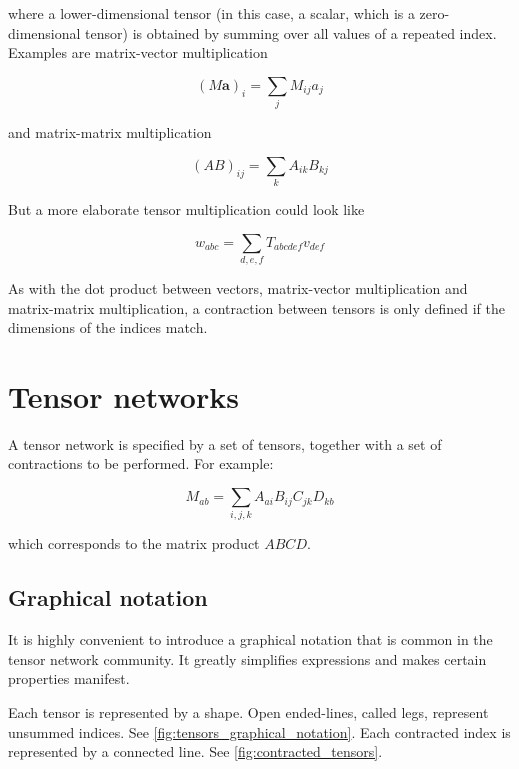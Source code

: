 where a lower-dimensional tensor (in this case, a scalar, which is a
zero-dimensional tensor) is obtained by summing over all values of a repeated
index. Examples are matrix-vector multiplication

\begin{equation}
  (M \bm{a})_{i} = \sum_j M_{i j} a_j
\end{equation}

and matrix-matrix multiplication

\begin{equation}
  (A B)_{i j} = \sum_k A_{i k} B_{k j}
\end{equation}

But a more elaborate tensor multiplication could look like

\begin{equation}
  w_{a b c} = \sum_{d, e, f} T_{a b c d e f} v_{d e f}
\end{equation}

As with the dot product between vectors, matrix-vector multiplication and
matrix-matrix multiplication, a contraction between tensors is only defined if
the dimensions of the indices match.

\section{Tensor networks}

A tensor network is specified by a set of tensors, together with a set of contractions to be performed. For example:

\begin{equation}
  M_{a b} = \sum_{i, j, k} A_{a i} B_{i j} C_{j k} D_{k b}
\end{equation}

which corresponds to the matrix product $A B C D$.

\subsection{Graphical notation}
It is highly convenient to introduce a graphical notation that is common in the
tensor network community. It greatly simplifies expressions and makes certain
properties manifest.

Each tensor is represented by a shape. Open ended-lines, called legs, represent
unsummed indices. See \autoref{fig:tensors_graphical_notation}. Each contracted
index is represented by a connected line. See \autoref{fig:contracted_tensors}.

